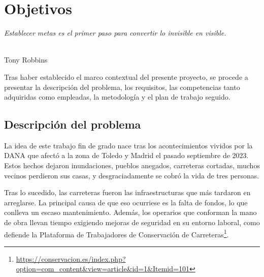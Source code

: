 \chapter{Objetivos}
\label{cap:capitulo3}

\begin{flushright}
\begin{minipage}[]{10cm}
\emph{Establecer metas es el primer paso para convertir lo invisible en visible.}\\
\end{minipage}\\

Tony Robbins\\
\end{flushright}

\vspace{1cm}
\setcounter{footnote}{31} 

Tras haber establecido el marco contextual del presente proyecto, se procede a presentar la descripción del problema, los requisitos, las competencias tanto adquiridas como empleadas, la metodología y el plan de trabajo seguido.

\section{Descripción del problema}
\label{sec:descripcion}

La idea de este trabajo fin de grado nace tras los acontecimientos vividos por la \ac{DANA} que afectó a la zona de Toledo y Madrid el pasado septiembre de 2023. Estos hechos dejaron inundaciones, pueblos anegados, carreteras cortadas, muchos vecinos perdieron sus casas, y desgraciadamente se cobró la vida de tres personas. 

Tras lo sucedido, las carreteras fueron las infraestructuras que más tardaron en arreglarse. La principal causa de que eso ocurriese es la falta de fondos, lo que conlleva un escaso mantenimiento. Además, los operarios que conforman la mano de obra llevan tiempo exigiendo mejoras de seguridad en su entorno laboral, como defiende la Plataforma de Trabajadores de Conservación de Carreteras\footnote{\url{https://conservacion.es/index.php?option=com_content&view=article&id=1&Itemid=101}}.
   
